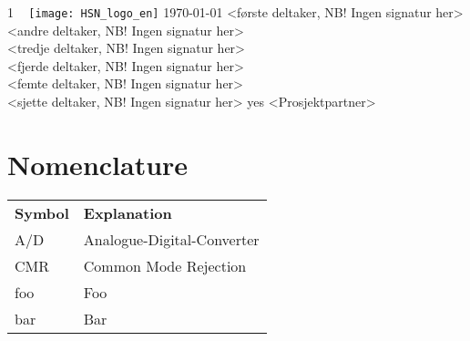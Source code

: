 \documentclass[%
    norsk,  %
]{USN-BSc}
\begin{document}
\USNtitlepage%
{1}
{~%
   \texttt{[image: HSN\_logo\_en]}}
{\today}  %
{%
<første deltaker, NB! Ingen signatur her>\\
<andre deltaker, NB! Ingen signatur her>\\
<tredje deltaker, NB! Ingen signatur her>\\
<fjerde deltaker, NB! Ingen signatur her>\\
<femte deltaker, NB! Ingen signatur her>\\
<sjette deltaker, NB! Ingen signatur her>
}
{yes} %
{<Prosjektpartner>}
{%
\lipsum[6-7]
}
{%
\lipsum[6-7]
}

\chapter*{\USNpreface}
\label{sec:preface}
\lipsum[1-3]

\tableofcontents
{}

\listoffigures %

\listoftables  %

\chapter*{Nomenclature}
\label{sec:nomenclature}

\begin{longtable}{ll}
  \textbf{Symbol} & \textbf{Explanation}\endhead\\
  A/D	& Analogue-Digital-Converter \\
  CMR	& Common Mode Rejection \\
  foo	& Foo \\
  bar 	& Bar
\end{longtable}


\end{document}
